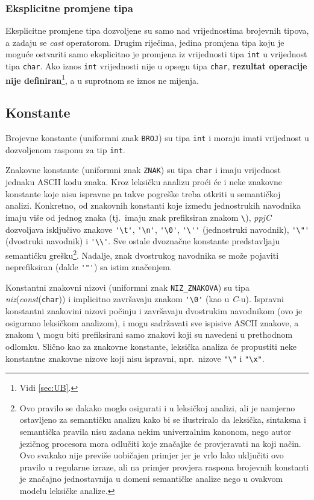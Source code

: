 \documentclass[times, 12pt, utf8]{book}
\begin{document}
\subsubsection{Eksplicitne promjene tipa}\label{sec:semantika_cast}
Eksplicitne promjene tipa dozvoljene su samo nad vrijednostima brojevnih tipova, a zadaju se \emph{cast} operatorom.
Drugim riječima, jedina promjena tipa koju je moguće ostvariti samo eksplicitno je promjena iz vrijednosti tipa \verb|int| u vrijednost tipa \verb|char|.
Ako iznos \verb|int| vrijednosti nije u opsegu tipa \verb|char|, \textbf{rezultat operacije nije definiran}\footnote{Vidi \ref{sec:UB}.}, a u suprotnom se iznos ne mijenja.

\subsection{Konstante}\label{sec:semantika_konstante}
Brojevne konstante (uniformni znak \verb|BROJ|) su tipa \verb|int| i moraju imati vrijednost u dozvoljenom rasponu za tip \verb|int|.

Znakovne konstante (uniformni znak \verb|ZNAK|) su tipa \verb|char| i imaju vrijednost jednaku ASCII kodu znaka.
Kroz leksičku analizu proći će i neke znakovne konstante koje nisu ispravne pa takve pogreške treba otkriti u semantičkoj analizi.
Konkretno, od znakovnih konstanti koje između jednostrukih navodnika imaju više od jednog znaka (tj.~imaju znak prefiksiran znakom \verb|\|), \emph{ppjC} dozvoljava isključivo znakove \verb|'\t'|, \verb|'\n'|, \verb|'\0'|, \verb|'\''| (jednostruki navodnik), \verb|'\"'| (dvostruki navodnik) i \verb|'\\'|.
Sve ostale dvoznačne konstante predstavljaju semantičku grešku\footnote{Ovo pravilo se dakako moglo osigurati i u leksičkoj analizi, ali je namjerno ostavljeno za semantičku analizu kako bi se ilustriralo da leksička, sintaksna i semantička pravila nisu zadana nekim univerzalnim kanonom, nego autor jezičnog procesora mora odlučiti koje značajke će provjeravati na koji način. Ovo svakako nije previše uobičajen primjer jer je vrlo lako uključiti ovo pravilo u regularne izraze, ali na primjer provjera raspona brojevnih konstanti je značajno jednostavnija u domeni semantičke analize nego u ovakvom modelu leksičke analize.}.
Nadalje, znak dvostrukog navodnika se može pojaviti neprefiksiran (dakle \verb|'"'|) sa istim značenjem.

Konstantni znakovni nizovi (uniformni znak \verb|NIZ_ZNAKOVA|) su tipa \emph{niz}(\emph{const}(\verb|char|)) i implicitno završavaju znakom \verb|'\0'| (kao u \emph{C}-u).
Ispravni konstantni znakovini nizovi počinju i završavaju dvostrukim navodnikom (ovo je osigurano leksičkom analizom), i mogu sadržavati sve ispisive ASCII znakove, a znakom \verb|\| mogu biti prefiksirani samo znakovi koji su navedeni u prethodnom odlomku.
Slično kao za znakovne konstante, leksička analiza će propustiti neke konstantne znakovne nizove koji nisu ispravni, npr.~nizove \verb|"\"| i \verb|"\x"|.
\end{document}

